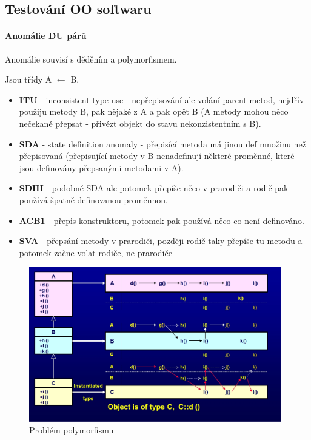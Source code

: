 \subsection{Testování OO softwaru}

\paragraph{Anomálie DU párů}

Anomálie souvisí s děděním a polymorfismem.

Jsou třídy A $\leftarrow$ B.

\begin{itemize}[itemsep=0px]
\item \textbf{ITU} - inconsistent type use - nepřepisování ale volání parent metod, nejdřív použiju metody B, pak nějaké z A a pak opět B (A metody mohou něco nečekaně přepsat - přivézt objekt do stavu nekonzistentním s B).

\item \textbf{SDA} - state definition anomaly - přepisící metoda má jinou def množinu než přepisovaná (přepisující metody v B nenadefinují některé proměnné, které jsou definovány přepsanými metodami v A).

\item \textbf{SDIH} - podobné SDA ale potomek přepíše něco v prarodiči a rodič pak používá špatně definovanou proměnnou.

\item \textbf{ACB1} - přepis konstruktoru, potomek pak používá něco co není definováno.

\item \textbf{SVA} - přepsání metody v prarodiči, později rodič taky přepíše tu metodu a potomek začne volat rodiče, ne prarodiče
\end{itemize}

\begin{figure}[h!]
\centering
\includegraphics[width=110mm]{14/images/oo-problem-polymorfismu}
\vspace{-5px}
\caption{Problém polymorfismu}
\end{figure}

